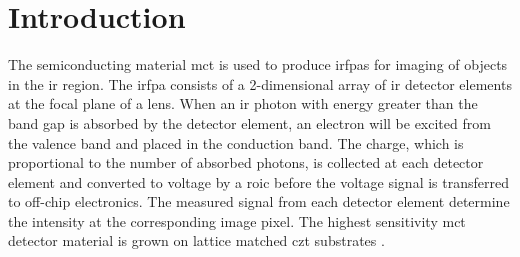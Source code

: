 \chapter{Introduction}




The semiconducting material \ac{mct} is used to produce \acp{irfpa} for imaging of objects in the \ac{ir} region. The \ac{irfpa} consists of a 2-dimensional array of \ac{ir} detector elements at the focal plane of a lens. When an \ac{ir} photon with energy greater than the band gap is absorbed by the detector element, an electron will be excited from the valence band and placed in the conduction band. The charge, which is proportional to the number of absorbed photons, is collected at each detector element and converted to voltage by a \ac{roic} before the voltage signal is transferred to off-chip electronics. The measured signal from each detector element determine the intensity at the corresponding image pixel. The highest sensitivity \ac{mct} detector material is grown on lattice matched \ac{czt} substrates \citep{benson2016analysis}.

